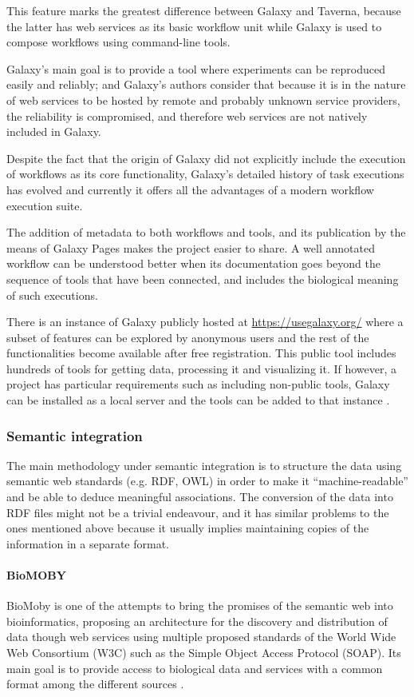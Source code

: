 This feature marks the greatest difference between Galaxy and Taverna, because the latter has web services as its basic workflow unit while Galaxy is used to compose workflows using command-line tools.

Galaxy's main goal is to provide a tool where experiments can be reproduced easily and reliably; and Galaxy's authors consider that because it is in the nature of web services to be hosted by remote and probably unknown service providers, the reliability is compromised, and therefore web services are not natively included in Galaxy.

Despite the fact that the origin of Galaxy did not explicitly include the execution of workflows as its core functionality, Galaxy's detailed history of task executions has evolved and currently it offers all the advantages of a modern workflow execution suite.

The addition of metadata to both workflows and tools, and its publication by the means of Galaxy Pages makes the project easier to share. A well annotated workflow can be understood better when its documentation goes beyond the sequence of tools that have been connected, and includes the biological meaning of such executions.

There is an instance of Galaxy publicly hosted at \url{https://usegalaxy.org/} where a subset of features can be explored by anonymous users and the rest of the functionalities become available after free registration. This public tool includes hundreds of tools for getting data, processing it and visualizing it. If however, a project has particular requirements such as including non-public tools, Galaxy can be installed as a local server and the tools can be added to that instance \cite{GIA2005, GOE2010}.


\subsubsection{Semantic integration} 
The main methodology under semantic integration is to structure the data using semantic web standards (e.g. RDF, OWL) in order to make it ``machine-readable'' and be able to deduce meaningful associations. The conversion of the data into RDF files might not be a trivial endeavour, and it has similar problems to the ones mentioned above because it usually implies maintaining copies of the information in a separate format. 

\paragraph{BioMOBY}
BioMoby is one of the attempts to bring the promises of the semantic web into bioinformatics, proposing an architecture for the discovery and distribution of data though web services using multiple proposed standards of the World Wide Web Consortium (W3C) such as the Simple Object Access Protocol (SOAP). Its main goal is to provide access to biological data and services with a common format among the different sources \cite{WIL2002}.

